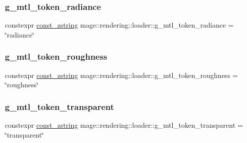 \hypertarget{namespacemage_1_1rendering_1_1loader_a5abd3a154bef9be04f7649447c50164a}{}\label{namespacemage_1_1rendering_1_1loader_a5abd3a154bef9be04f7649447c50164a} 
\subsubsection{\texorpdfstring{g\+\_\+mtl\+\_\+token\+\_\+radiance}{g\_mtl\_token\_radiance}}
{\footnotesize\ttfamily constexpr \hyperlink{namespacemage_abfd9206dc607ceb5d13ec68bf075a5c0}{const\+\_\+zstring} mage\+::rendering\+::loader\+::g\+\_\+mtl\+\_\+token\+\_\+radiance = \char`\"{}radiance\char`\"{}}

\hypertarget{namespacemage_1_1rendering_1_1loader_a2ec32e8ddd043f1989ca6b58ad964c32}{}\label{namespacemage_1_1rendering_1_1loader_a2ec32e8ddd043f1989ca6b58ad964c32} 
\subsubsection{\texorpdfstring{g\+\_\+mtl\+\_\+token\+\_\+roughness}{g\_mtl\_token\_roughness}}
{\footnotesize\ttfamily constexpr \hyperlink{namespacemage_abfd9206dc607ceb5d13ec68bf075a5c0}{const\+\_\+zstring} mage\+::rendering\+::loader\+::g\+\_\+mtl\+\_\+token\+\_\+roughness = \char`\"{}roughness\char`\"{}}

\hypertarget{namespacemage_1_1rendering_1_1loader_a2e86bdf00ab5d9721684b02b575a9df7}{}\label{namespacemage_1_1rendering_1_1loader_a2e86bdf00ab5d9721684b02b575a9df7} 
\subsubsection{\texorpdfstring{g\+\_\+mtl\+\_\+token\+\_\+transparent}{g\_mtl\_token\_transparent}}
{\footnotesize\ttfamily constexpr \hyperlink{namespacemage_abfd9206dc607ceb5d13ec68bf075a5c0}{const\+\_\+zstring} mage\+::rendering\+::loader\+::g\+\_\+mtl\+\_\+token\+\_\+transparent = \char`\"{}transparent\char`\"{}}

